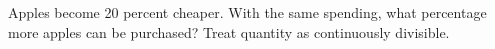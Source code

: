 Apples become 20 percent cheaper. With the same spending, what percentage more apples can be purchased? Treat quantity as continuously divisible.
